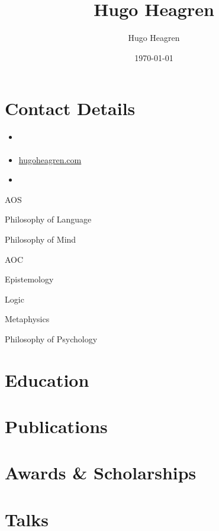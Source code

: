 \documentclass{cv}
\author{Hugo Heagren}
\date{\today}
\title{Hugo Heagren}
\begin{document}
\maketitle
\nocite{*}

\section*{Contact Details}
\begin{itemize}
\item \href{mailto:\JSONParseExpandableValue{\info}{email}}{}
\item \href{https://hugoheagren.com}{hugoheagren.com}
\item {}
\end{itemize}

\begin{areas}
\item[{AOS}]%
  \begin{area}
  \item Philosophy of Language
  \item Philosophy of Mind
  \end{area}
\item[{AOC}]%
  \begin{area}
  \item Epistemology
  \item Logic
  \item Metaphysics
  \item Philosophy of Psychology
\end{area}
\end{areas}

\section*{Education}
\printbibliography[check=Education]{}

\section*{Publications}
\printbibliography[check=Article]{}

\section*{Awards \& Scholarships}
\printbibliography[check=Funding]{}

\section*{Talks }
\printbibliography[check=Presentation]{}
\end{document}
